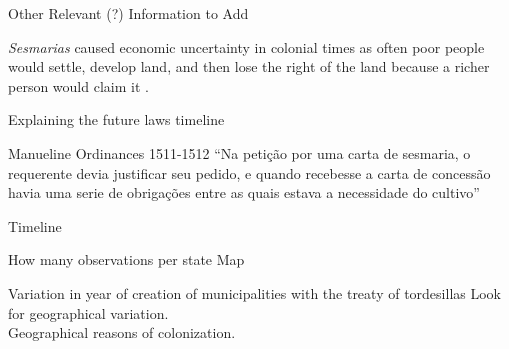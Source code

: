 \documentclass[aspectratio=1610]{beamer}
\begin{document}
\appendix

\begin{frame}{Other Relevant (?) Information to Add}
    \begin{outline}
        \1 \textit{Sesmarias} caused economic uncertainty in colonial times as often poor people would settle, develop land, and then lose the right of the land because a richer person would claim it \parencite[p.~142]{Da_Costa_Porto1979-dz}.
    \end{outline}
\end{frame}

\begin{frame}{Explaining the future laws timeline}
    
\end{frame}

\begin{frame}{Manueline Ordinances 1511-1512}
    ``Na petição por uma carta de sesmaria, o requerente devia justificar seu pedido, e quando recebesse a carta de concessão havia uma serie de obrigações entre as quais estava a necessidade do cultivo''
\end{frame}

\begin{frame}{Timeline}
    
\end{frame}

\begin{frame}{How many observations per state Map}
    
\end{frame}

\begin{frame}{Variation in year of creation of municipalities with the treaty of tordesillas}
    Look for geographical variation.
    \\
    Geographical reasons of colonization.
\end{frame}
\end{document}
